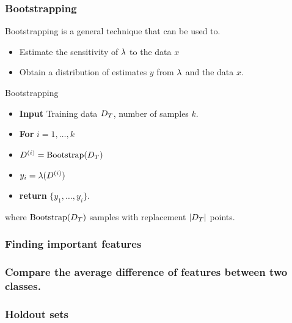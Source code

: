 \begin{frame}
  \frametitle{Bootstrapping}
  Bootstrapping is a general technique that can be used to.
  \begin{itemize}
  \item Estimate the sensitivity of $\lambda$ to the data $x$
  \item Obtain a distribution of estimates $y$ from $\lambda$ and the data $x$.
  \end{itemize}
  \begin{block}{Bootstrapping}
    \begin{itemize}
    \item \textbf{Input} Training data $D_T$, number of samples $k$.
    \item \textbf{For} $i = 1, \ldots, k$
    \item \quad $D^{(i)} = \textrm{Bootstrap}(D_T)$
    \item \quad $y_i = \lambda(D^{(i)})$
    \item \textbf{return} $\{y_1, \ldots, y_i\}$.
    \end{itemize}
    where  $\textrm{Bootstrap}(D_T)$ samples with replacement $|D_T|$ points.
  \end{block}

\end{frame}

\begin{frame}
  \frametitle{Finding important features}
\end{frame}

\begin{frame}
  \frametitle{Compare the average difference of features between two classes.}
\end{frame}

\begin{frame}
  \frametitle{Holdout sets}
\end{frame}

